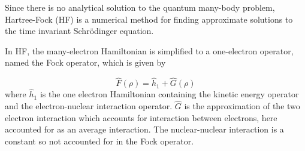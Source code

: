 \documentclass[twoside]{article}
\begin{document}




Since there is no analytical solution to the quantum many-body problem, Hartree-Fock (HF) is a numerical method for finding approximate solutions to the time invariant Schr\"{o}dinger equation. 










In HF, the many-electron Hamiltonian is simplified to a one-electron operator, named the Fock operator, which is given by

\[
\hat{F}(\rho) = \hat{h}_1 + \hat{G}(\rho)
\]
where $\hat{h}_1$ is the one electron Hamiltonian containing the kinetic energy operator and the electron-nuclear interaction operator. $\hat{G}$ is the approximation of the two electron interaction which accounts for interaction between electrons, here accounted for as an average interaction. The nuclear-nuclear interaction is a constant so not accounted for in the Fock operator. 
\end{document}

